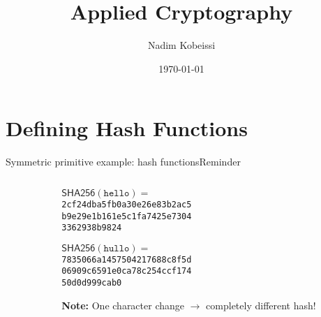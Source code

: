 \documentclass[aspectratio=169, lualatex, handout]{beamer}
\title{Applied Cryptography}
\author{Nadim Kobeissi}
\institute{American University of Beirut}
\date{\today}
\begin{document}
\begin{frame}[plain]
	\titlepage
\end{frame}

\section{Defining Hash Functions}

\begin{frame}{Symmetric primitive example: hash functions}{Reminder}
	\begin{columns}[c]
		\begin{column}{0.55\textwidth}
		\end{column}
		\begin{column}{0.45\textwidth}
			\begin{tcolorbox}
				[colback=black!5!white,colframe=ciphergray] $\mathsf{SHA256}(\texttt{hello}) =$ \\ \texttt{2cf24dba5fb0a30e26e83b2ac5}\\ \texttt{b9e29e1b161e5c1fa7425e7304}\\
				\texttt{3362938b9824}

				$\mathsf{SHA256}(\texttt{hullo}) =$ \\ \texttt{7835066a1457504217688c8f5d}\\
				\texttt{06909c6591e0ca78c254ccf174}\\ \texttt{50d0d999cab0}
			\end{tcolorbox}
			\textcolor{cipherprimary}{\textbf{Note:} \small One character change $\rightarrow$
				completely different hash!}
		\end{column}
	\end{columns}
\end{frame}
\end{document}
